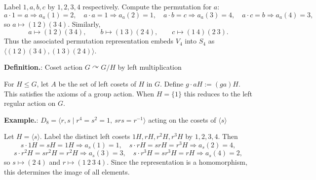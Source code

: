 \documentclass[12pt]{article}
\theoremstyle{definition}
\begin{document}
\newpage

Label $1,a,b,c$ by $1,2,3,4$ respectively. Compute the permutation for $a$:
\[
a\cdot 1=a\Rightarrow a_a(1)=2,\quad
a\cdot a=1\Rightarrow a_a(2)=1,\quad
a\cdot b=c\Rightarrow a_a(3)=4,\quad
a\cdot c=b\Rightarrow a_a(4)=3,
\]
so $a\mapsto (1\ 2)(3\ 4)$. Similarly,
\[
a\mapsto (1\ 2)(3\ 4),\qquad
b\mapsto (1\ 3)(2\ 4),\qquad
c\mapsto (1\ 4)(2\ 3).
\]
Thus the associated permutation representation embeds $V_4$ into $S_4$ as $\langle(1\ 2)(3\ 4),(1\ 3)(2\ 4)\rangle$.\\


\newpage


\noindent\textbf{Definition.}: Coset action $G\curvearrowright G/H$ by left multiplication

\newpage

For $H\le G$, let $A$ be the set of left cosets of $H$ in $G$. Define $g\cdot aH:=(ga)H$. This satisfies the axioms of a group action. When $H=\{1\}$ this reduces to the left regular action on $G$.\\


\newpage


\noindent\textbf{Example.}: $D_8=\langle r,s\mid r^4=s^2=1,\ srs=r^{-1}\rangle$ acting on the cosets of $\langle s\rangle$

\newpage

Let $H=\langle s\rangle$. Label the distinct left cosets $1H,rH,r^2H,r^3H$ by $1,2,3,4$. Then
\[
s\cdot 1H=sH=1H\Rightarrow a_s(1)=1,\quad
s\cdot rH=srH=r^3H\Rightarrow a_s(2)=4,
\]
\[
s\cdot r^2H=sr^2H=r^2H\Rightarrow a_s(3)=3,\quad
s\cdot r^3H=sr^3H=rH\Rightarrow a_s(4)=2,
\]
so $s\mapsto (2\ 4)$ and $r\mapsto (1\ 2\ 3\ 4)$. Since the representation is a homomorphism, this determines the image of all elements.\\

\end{document}

